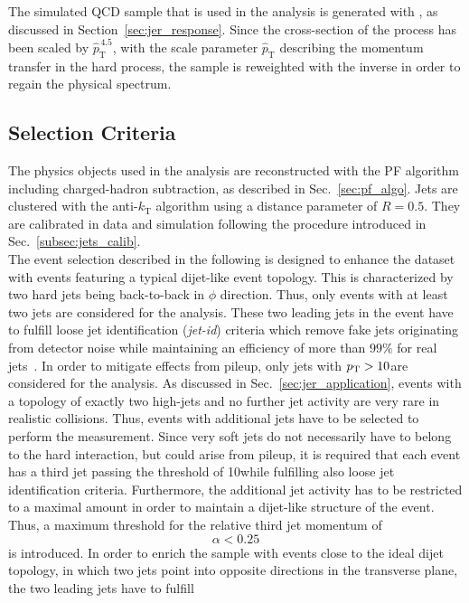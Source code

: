 The simulated QCD sample that is used in the analysis is generated with \pythia, as discussed in Section~\ref{sec:jer_response}. Since the cross-section of the process has been scaled by $\hat{p}_\mathrm{T}^{\,4.5}$, with the scale parameter $\hat{p}_\mathrm{T}$ describing the momentum transfer in the hard process, the sample is reweighted with the inverse in order to regain the physical spectrum.  

\subsection{Selection Criteria}
\label{subsec:jer_sel_cuts}
The physics objects used in the analysis are reconstructed with the PF algorithm including charged-hadron subtraction, as described in Sec.~\ref{sec:pf_algo}. Jets are clustered with the anti-$k_\mathrm{T}$ algorithm using a distance parameter of $R=0.5$. They are calibrated in data and simulation following the procedure introduced in Sec.~\ref{subsec:jets_calib}.  \\
The event selection described in the following is designed to enhance the dataset with events featuring a typical dijet-like event topology. This is characterized by two hard jets being back-to-back in $\phi$ direction. Thus, only events with at least two jets are considered for the analysis. These two leading jets in the event have to fulfill loose jet identification (\textit{jet-id}) criteria which remove fake jets originating from detector noise while maintaining an efficiency of more than $99\%$ for real jets~\cite{CMS-PAS-JME-09-008, CMS-PAS-JME-10-003}. In order to mitigate effects from pileup, only jets with $p_{\text{T}} > 10$\gev are considered for the analysis. As discussed in Sec.~\ref{sec:jer_application}, events with a topology of exactly two high-\pt jets and no further jet activity are very rare in realistic collisions. Thus, events with additional jets have to be selected to perform the measurement. Since very soft jets do not necessarily have to belong to the hard interaction, but could arise from pileup, it is required that each event has a third jet passing the \pt threshold of 10\gev while fulfilling also loose jet identification criteria. Furthermore, the additional jet activity has to be restricted to a maximal amount in order to maintain a dijet-like structure of the event. Thus, a maximum threshold for the relative third jet momentum of 
\begin{equation*}
\alpha < 0.25 
\end{equation*}
is introduced. In order to enrich the sample with events close to the ideal dijet topology, in which two jets point into opposite directions in the transverse plane, the two leading jets have to fulfill 
